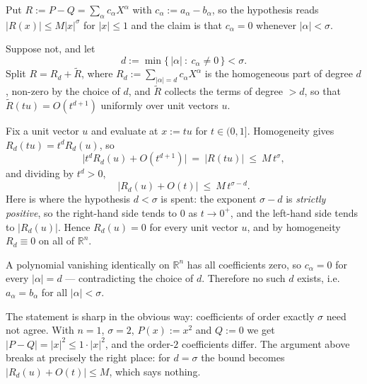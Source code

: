 \begin{exercisesolution}
\label{sol:polynomials_multivariate_expansion}
Put $R := P - Q = \sum_\alpha c_\alpha X^\alpha$ with $c_\alpha := a_\alpha - b_\alpha$, so the
hypothesis reads $|R(x)| \leq M|x|^\sigma$ for $|x| \leq 1$ and the claim is that
$c_\alpha = 0$ whenever $|\alpha| < \sigma$.

Suppose not, and let
\[d := \min\{\,|\alpha| \ :\ c_\alpha \neq 0\,\} < \sigma.\]
Split $R = R_d + \widetilde R$, where $R_d := \sum_{|\alpha| = d}c_\alpha X^\alpha$ is the
homogeneous part of degree $d$, non-zero by the choice of $d$, and $\widetilde R$ collects
the terms of degree $> d$, so that $\widetilde R(tu) = O(t^{d+1})$ uniformly over unit vectors
$u$.

Fix a unit vector $u$ and evaluate at $x := tu$ for $t \in (0,1]$. Homogeneity gives
$R_d(tu) = t^dR_d(u)$, so
\[\big|t^dR_d(u) + O(t^{d+1})\big| \ =\ |R(tu)| \ \leq\ M\,t^{\sigma},\]
and dividing by $t^d > 0$,
\[\big|R_d(u) + O(t)\big| \ \leq\ M\,t^{\sigma - d}.\]
Here is where the hypothesis $d < \sigma$ is spent: the exponent $\sigma - d$ is \emph{strictly
positive}, so the right-hand side tends to $0$ as $t \to 0^+$, and the left-hand side tends to
$|R_d(u)|$. Hence $R_d(u) = 0$ for every unit vector $u$, and by homogeneity $R_d \equiv 0$ on
all of $\mathbb{R}^n$.

A polynomial vanishing identically on $\mathbb{R}^n$ has all coefficients zero, so $c_\alpha = 0$
for every $|\alpha| = d$ --- contradicting the choice of $d$. Therefore no such $d$ exists, i.e.\
$a_\alpha = b_\alpha$ for all $|\alpha| < \sigma$.

\begin{ainote}
The statement is sharp in the obvious way: coefficients of order exactly $\sigma$ need not agree.
With $n=1$, $\sigma = 2$, $P(x) := x^2$ and $Q := 0$ we get $|P-Q| = |x|^2 \leq 1\cdot|x|^2$, and
the order-$2$ coefficients differ. The argument above breaks at precisely the right place: for
$d = \sigma$ the bound becomes $|R_d(u) + O(t)| \leq M$, which says nothing.
\end{ainote}
\end{exercisesolution}

